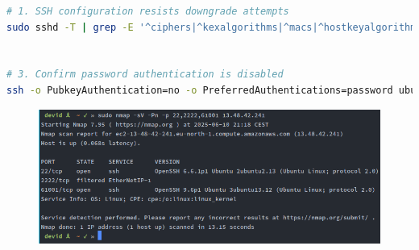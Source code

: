 \begin{lstlisting}[language=bash, label={annexes:ssh-hardening}, caption={SSH Service Hardening Validation}]  
# 1. SSH configuration resists downgrade attempts
sudo sshd -T | grep -E '^ciphers|^kexalgorithms|^macs|^hostkeyalgorithms'  


# 3. Confirm password authentication is disabled 
ssh -o PubkeyAuthentication=no -o PreferredAuthentications=password ubuntu@51.79.248.60 -p 61001  
\end{lstlisting}

\begin{figure}[h!]
    \centering
    \includegraphics[width=0.8\linewidth]{doc/img/annex_b_listing_3.png}
\end{figure}
\





\newpage

